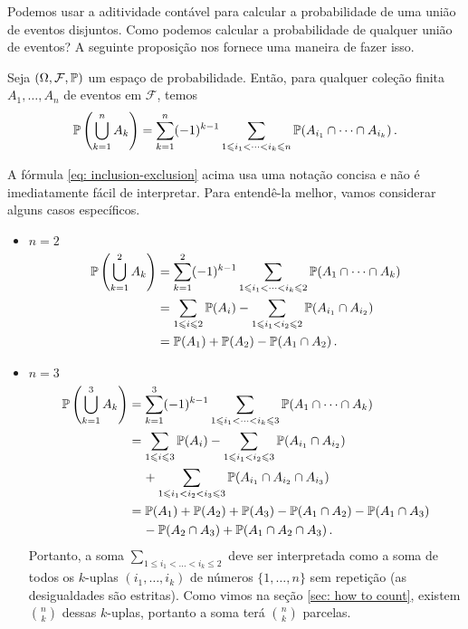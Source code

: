 Podemos usar a aditividade contável para calcular a probabilidade de uma união de eventos disjuntos. Como podemos calcular a probabilidade de qualquer união de eventos? A seguinte proposição nos fornece uma maneira de fazer isso.

\begin{proposition}
Seja $(\Omega, \mathcal{F}, \mathbb{P})$ um espaço de probabilidade. Então, para qualquer coleção finita $A_1, \dots, A_n$ de eventos em $\mathcal{F}$, temos
\begin{equation}
\label{eq: inclusion-exclusion}
\mathbb{P}\left( \bigcup_{k=1}^{n} A_k \right) = \sum_{k=1}^{n}(-1)^{k-1} 
\sum_{1 \leqslant i_1 < \dots < i_k \leqslant n} \mathbb{P}(A_{i_1} \cap \dots \cap A_{i_k}) \,.
\end{equation}
\end{proposition}

\begin{remark}
A fórmula \ref{eq: inclusion-exclusion} acima usa uma notação concisa e não é imediatamente fácil de interpretar. Para entendê-la melhor, vamos considerar alguns casos específicos.
\begin{itemize}

\item
$n=2$
\begin{align}
\mathbb{P}\left(\bigcup_{k=1}^{2} A_k\right) &= \sum_{k=1}^{2} (-1)^{k-1} \sum_{1 \leqslant i_1 < \dots < i_k \leqslant 2} \mathbb{P}(A_1 \cap \dots \cap A_k) \\
&= \sum_{1 \leqslant i \leqslant 2} \mathbb{P}(A_i) - \sum_{1 \leqslant i_1 < i_2 \leqslant 2} \mathbb{P}(A_{i_1} \cap A_{i_2}) \\
&= \mathbb{P}(A_1) + \mathbb{P}(A_2) - \mathbb{P}(A_1 \cap A_2) \,.
\end{align}
\item
$n=3$
\begin{align}
\mathbb{P}\left(\bigcup_{k=1}^{3} A_k\right) &= \sum_{k=1}^{3} (-1)^{k-1} \sum_{1 \leqslant i_1 < \dots < i_k \leqslant 3} \mathbb{P}(A_1 \cap \dots \cap A_k) \\
&= \sum_{1 \leqslant i \leqslant 3} \mathbb{P}(A_i) - \sum_{1 \leqslant i_1 < i_2 \leqslant 3} \mathbb{P}(A_{i_1} \cap A_{i_2}) \\
&\hspace{0.4cm} + \sum_{1 \leqslant i_1 < i_2 < i_3 \leqslant 3} \mathbb{P}(A_{i_1} \cap A_{i_2} \cap A_{i_3})\\
&= \mathbb{P}(A_1) + \mathbb{P}(A_2) + \mathbb{P}(A_3) - \mathbb{P}(A_1 \cap A_2) - \mathbb{P}(A_1 \cap A_3) \\
&\hspace{0.4cm} - \mathbb{P}(A_2 \cap A_3) + \mathbb{P}(A_1 \cap A_2 \cap A_3)\,.
\end{align}
Portanto, a soma $\sum_{1 \leq i_1 < \dots < i_k \leq 2}$ deve ser interpretada como a soma de todos os $k$-uplas $(i_1, \dots, i_k)$ de números $\{1, \dots, n\}$ sem repetição (as desigualdades são estritas). Como vimos na seção \ref{sec: how to count}, existem $\binom{n}{k}$ dessas $k$-uplas, portanto a soma terá $\binom{n}{k}$ parcelas.
\end{itemize}
\end{remark}


